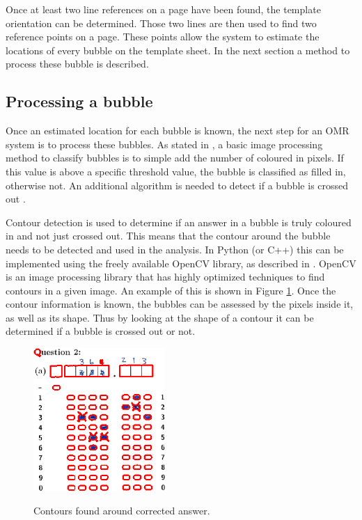 Once at least two line references on a page have been found, the template orientation can be determined. Those two lines are then used to find two reference points on a page. These points allow the system to estimate the locations of every bubble on the template sheet. In the next section a method to process these bubble is described.

\subsection{Processing a bubble}

Once an estimated location for each bubble is known, the next step for an OMR system is to process these bubbles. As stated in \citet{MVGI2015}, a basic image processing method to classify bubbles is to simple add the number of coloured in pixels. If this value is above a specific threshold value, the bubble is classified as filled in, otherwise not. An additional algorithm is needed to detect if a bubble is crossed out .

Contour detection is used to determine if an answer in a bubble is truly coloured in and not just crossed out. This means that the contour around the bubble needs to be detected and used in the analysis. In Python (or C++) this can be implemented using the freely available OpenCV library, as described in \citet{AdrianR2016}. OpenCV is an image processing library that has highly optimized techniques to find contours in a given image. An example of this is shown in Figure \ref{fig:Cross}. Once the contour information is known, the bubbles can be assessed by the pixels inside it, as well as its shape. Thus by looking at the shape of a contour it can be determined if a bubble is crossed out or not.
\begin{figure}
  \centering
  \includegraphics[width=5cm]{Cross}\\
  \caption{Contours found around corrected answer.}
  \label{fig:Cross}
\end{figure}

